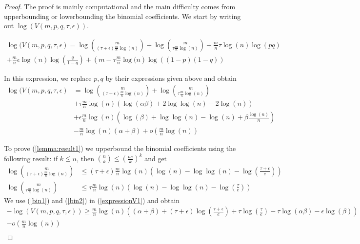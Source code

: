 \documentclass[english]{article}
\newcommand{\1}{\textbf{1}}
\begin{document}
\begin{proof}
The proof is mainly computational and the main difficulty comes from upperbounding or lowerbounding the binomial coefficients. We start by writing out $\log(V(m,p,q,\tau,\epsilon))$.

\begin{align*}
\log(V(m,p,q,\tau, \epsilon)=\log \binom{m}{(\tau+\epsilon)\frac{m}{n}\log(n)}+\log \binom{m}{\tau\frac{m}{n}\log(n)} +\frac{m}{n}\tau \log(n) \log(pq)\\
+\frac{m}{n} \epsilon \log(n) \log \left( \frac{q}{1-q}\right)+\left(m -\tau \frac{m}{n}\log(n \right) \log\left((1-p)(1-q)\right)
\end{align*}

In this expression, we replace $p,q$ by their expressions given above and obtain
\begin{align} \label{expressionV1}
\log(V(m,p,q,\tau, \epsilon)&=\log \binom{m}{(\tau+\epsilon)\frac{m}{n}\log(n)}+\log \binom{m}{\tau\frac{m}{n}\log(n)} \nonumber\\
&+\tau \frac{m}{n} \log(n)   \left( \log(\alpha \beta)+2\log \log(n) -2\log(n) \right)\\
&+\epsilon \frac{m}{n} \log(n) \left( \log(\beta)+\log \log(n) -\log(n) +\beta \frac{\log(n)}{n} \right) \nonumber \\
& - \frac{m}{n} \log(n) (\alpha +\beta) + o \left( \frac{m}{n} \log(n) \right) \nonumber
\end{align}

To prove (\ref{lemma:result1}) we upperbound the binomial coefficients using the following result: if $k\leq n$, then $\binom{n}{k} \leq  \left( \frac{ne}{k} \right)^k$ and get
\begin{align}
\log \binom{m}{(\tau +\epsilon) \frac{m}{n}\log(n)} &\leq (\tau +\epsilon) \frac{m}{n} \log(n) \left( \log(n) -\log \log(n) -\log \left( \frac{\tau +\epsilon}{e}\right)\right) \label{bin1}\\
\log \binom{m}{\tau \frac{m}{n} \log(n)} &\leq \tau \frac{m}{n} \log(n) \left( \log(n) -\log \log(n) -\log \left( \frac{\tau}{e}\right)\right) \label{bin2}
\end{align}
We use (\ref{bin1}) and (\ref{bin2}) in (\ref{expressionV1}) and obtain
\begin{align} \label{expressionV2}
-\log(V(m,p,q,\tau, \epsilon)) \geq \frac{m}{n}\log(n) \left( (\alpha +\beta) +(\tau+\epsilon)\log \left( \frac{\tau +\epsilon}{e}\right) +\tau \log \left( \frac{\tau}{e}\right) -\tau \log(\alpha \beta) -\epsilon \log(\beta) \right)\\
 - o \left( \frac{m}{n} \log(n) \right) \nonumber\\ \nonumber
\end{align} 


\end{proof}
\end{document}
